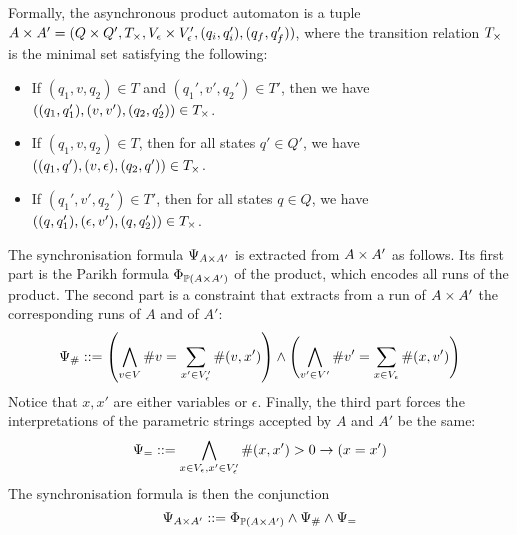 \documentclass[sigplan,review,anonymous]{acmart}\settopmatter{printfolios=true,printccs=false,printacmref=false}
\begin{document}
Formally, the asynchronous product automaton is a tuple $A \times A' = (Q\times Q', T_\times, V_\epsilon \times V'_\epsilon, (q_i,q_i'),(q_f,q_f'))$, where the transition relation $T_\times$ is the minimal set satisfying the following:
%
\begin{itemize}
\item If $(q_1,v,q_2) \in T$ and $(q_1',v',q_2') \in T'$, then we have $((q_1,q_1'),(v,v'),(q_2,q_2'))\in T_\times$.
\item If $(q_1,v,q_2) \in T$, then for all states $q'\in Q'$, we have $((q_1,q'),(v,\epsilon),(q_2,q'))\in T_\times$.
\item If $(q_1',v',q_2') \in T'$, then for all states $q\in Q$, we have $((q,q_1'),(\epsilon,v'),(q,q_2'))\in T_\times$.
\end{itemize}	
%
The synchronisation formula $\Psi_{A \times A'}$ is extracted from $A \times A'$ as follows.
Its first part is the Parikh formula $\Phi_{\mathbb{P}{(A \times A')}}$ of the product, which encodes all runs of the product.
%
The second part is a constraint that extracts from a run of $A \times A'$ the corresponding runs of $A$ and of $A'$:
$$ \Psi_{\#} ::= 
\left(\bigwedge_{v\in V}\#v = \sum_{x' \in V'_\epsilon} \#{(v,x')}\right)
\land
\left(\bigwedge_{v'\in V'} \#v' = \sum_{x \in V_\epsilon} \#{(x,v')}\right)
$$
Notice that $x,x'$ are either variables or $\epsilon$.
Finally, the third part forces the interpretations of the parametric strings accepted by $A$ and $A'$ be the same:
$$ \Psi_= ::=
\bigwedge_{x\in V_\epsilon,x'\in V'_\epsilon} \#(x,x')>0 \rightarrow (x=x')
$$
The synchronisation formula is then the conjunction 
$$
\Psi_{A \times A'} ::= \Phi_{\mathbb{P}{(A \times A')}} \land \Psi_{\#} \land \Psi_=
$$
\end{document}
